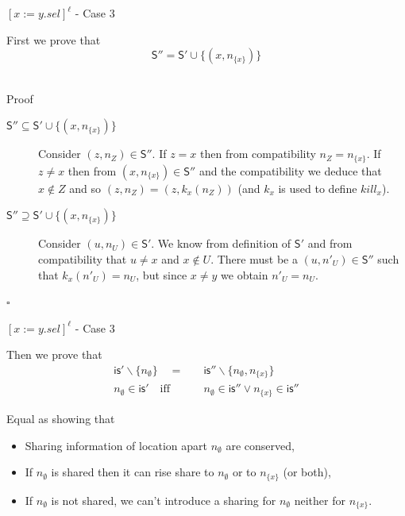 \documentclass[xcolor=svgnames,11pt]{beamer}
\begin{document}
\begin{frame}[fragile]{$[x:=y.sel]^\ell$ - Case 3}

First we prove that $$ \mathsf{S'' = S'} \cup \{(x, n_{ \{x\} }) \} $$ \\

\pause

\begin{block}{Proof}

\begin{footnotesize}

\begin{description}
\item[$ \mathsf{S'' \subseteq S'} \cup \{(x, n_{ \{x\} }) \}  $] Consider $(z, n_Z) \in \mathsf{S''}$. If $z = x$ then from compatibility $n_Z = n_{ \{x\} }$. If $z \neq x$ then from $(x, n_{ \{x\} }) \in \mathsf{S''}$ and the compatibility we deduce that $x \not\in Z$ and so $(z, n_Z) = (z, k_x (n_Z))$ (and $k_x$ is used to define $kill_x$).\\
\item[$  \mathsf{S'' \supseteq S'} \cup \{(x, n_{ \{x\} }) \}  $] Consider $(u, n_U) \in \mathsf{S'}$. We know from definition of $\mathsf{S'}$ and from compatibility that $u \neq x$ and $x \not\in U$. There must be a $(u, n'_{U}) \in \mathsf{S''}$ such that $k_x(n'_U) = n_U$, but since $x \neq y$ we obtain $n'_U = n_U$.\\
\end{description}

\begin{flushright}
$\square$
\end{flushright}
\end{footnotesize}

\end{block}

\end{frame}


\begin{frame}{$[x:=y.sel]^\ell$ - Case 3}

Then we prove that
\begin{align*}
\mathsf{is'} \backslash \{ n_\emptyset \} \quad=&\quad \mathsf{is''} \backslash \{ n_\emptyset, n_{\{ x \}} \} \\
n_\emptyset \in \mathsf{is'} \quad\mathrm{iff}&\quad n_\emptyset \in \mathsf{is''} \vee n_{\{ x \}} \in \mathsf{is''}
\end{align*} 

\medskip
\pause

Equal as showing that
\begin{itemize}
\item Sharing information of location apart $n_\emptyset$ are conserved,
\item If $n_\emptyset$ is shared then it can rise share to $n_\emptyset$ or to $n_{\{ x \}}$ (or both),
\item If $n_\emptyset$ is not shared, we can't introduce a sharing for $n_\emptyset$ neither for $n_{\{ x \}}$.
\end{itemize}

\end{frame}
\end{document}
